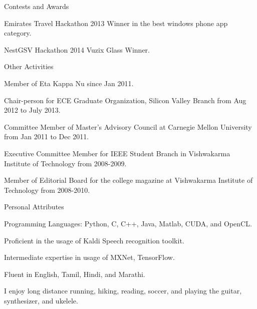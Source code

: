 \documentclass{resume} %
\begin{document}
\begin{rSection}{Contests and Awards}
\begin{rSubsection}{}{}{}{}
\item Emirates Travel Hackathon 2013 Winner in the best windows phone app category.
\item NestGSV Hackathon 2014 Vuzix Glass Winner.
\end{rSubsection}
\end{rSection}

\begin{rSection}{Other Activities}
\begin{rSubsection}{}{}{}{}
\item Member of Eta Kappa Nu since Jan 2011.
\item Chair-person for ECE Graduate Organization, Silicon Valley Branch from Aug 2012 to July 2013.
\item Committee Member of Master's Advisory Council at Carnegie Mellon University from Jan 2011 to Dec 2011.
\item Executive Committee Member for IEEE Student Branch in Vishwakarma Institute of Technology from 2008-2009.
\item Member of Editorial Board for the college magazine at Vishwakarma Institute of Technology from 2008-2010.

\end{rSubsection}
\end{rSection}
\begin{rSection}{Personal Attributes}
\begin{rSubsection}{}{}{}{}
\item Programming Languages: Python, C, C++, Java, Matlab, CUDA, and OpenCL.
\item Proficient in the usage of Kaldi Speech recognition toolkit.
\item Intermediate expertise in usage of MXNet, TensorFlow.
\item Fluent in English, Tamil, Hindi, and Marathi.
\item I enjoy long distance running, hiking, reading, soccer, and playing the guitar, synthesizer, and ukelele.
\end{rSubsection}
\end{rSection}

\end{document}
